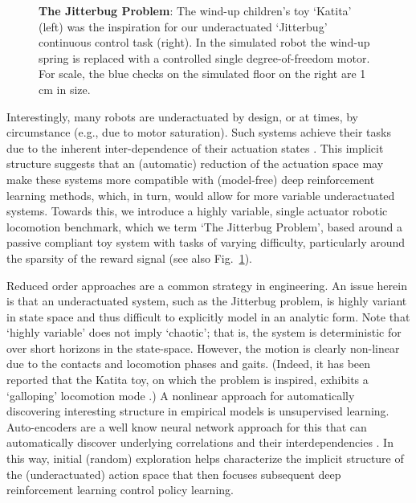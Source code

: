 \documentclass[letterpaper, 10 pt, conference]{ieeeconf}
\begin{document}
\begin{figure}[t]
    \setlength{\belowcaptionskip}{-10pt}
    \caption{
        \textbf{The Jitterbug Problem}: The wind-up children's toy `Katita' (left) was the inspiration for our underactuated `Jitterbug' continuous control task (right).
        In the simulated robot the wind-up spring is replaced with a controlled single degree-of-freedom motor.
        For scale, the blue checks on the simulated floor on the right are 1 cm in size.
        }
        \vspace*{-6pt}
    \label{fig:leader}
    
\end{figure} 

Interestingly, many robots are underactuated by design, or at times, by circumstance (e.g., due to motor saturation).
Such systems achieve their tasks due to the inherent inter-dependence of their actuation states \cite{spong1998underactuated}.
This implicit structure suggests that an (automatic) reduction of the actuation space may make these systems more compatible with (model-free) deep reinforcement learning methods, which, in turn, would allow for more variable underactuated systems.
Towards this, we introduce a highly variable, single actuator robotic locomotion benchmark, which we term `The Jitterbug Problem', based around a passive compliant toy system with tasks of varying difficulty, particularly around the sparsity of the reward signal (see also Fig.~\ref{fig:leader}).

Reduced order approaches are a common strategy in engineering.
An issue herein is that an underactuated system, such as the Jitterbug problem, is highly variant in state space and thus difficult to explicitly model in an analytic form.
Note that `highly variable' does not imply `chaotic'; that is, the system is deterministic for over short horizons in the state-space.
However, the motion is clearly non-linear due to the contacts and locomotion phases and gaits.  (Indeed, it has been reported that the Katita toy, on which the problem is inspired, exhibits a `galloping' locomotion mode \cite{jgn.thesis}.)
A nonlinear approach for automatically discovering interesting structure in empirical models is unsupervised learning.
Auto-encoders are a well know neural network approach for this that can automatically discover underlying correlations and their interdependencies \cite{AE_hinton2006reducing}.
In this way, initial (random) exploration helps characterize the implicit structure of the (underactuated) action space that then focuses subsequent deep reinforcement learning control policy learning.
\end{document}
